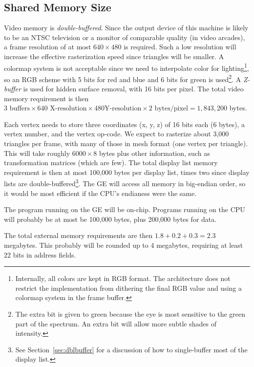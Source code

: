 \documentclass{book}
\begin{document}
\subsection{Shared Memory Size}

\quad Video memory is {\em
double-buffered}.  Since the output device of this machine is likely
to be an NTSC television or a monitor of comparable quality (in video
arcades), a frame resolution of at most $640\times480$ is required. 
Such a low resolution will increase the effective rasterization speed
since triangles will be smaller.  A colormap system is not acceptable
since we need to interpolate color for lighting\footnote{Internally,
all colors are kept in RGB format.  The architecture does not restrict
the implementation from dithering the final RGB value and using a
colormap system in the frame buffer.}, so an RGB scheme with 5 bits
for red and blue and 6 bits for green is used\footnote{The extra bit
is given to green because the eye is most sensitive to the green part
of the spectrum.  An extra bit will allow more subtle shades of
intensity.}.  A {\em Z-buffer\/} is used for hidden surface removal,
with 16 bits per pixel.  The total video memory requirement is then
$3\mbox{ buffers}\times640\mbox{ X-resolution}\times480\mbox{
Y-resolution}\times2\mbox{ bytes/pixel} = 1,843,200$ bytes.

\vspace{1ex}\quad Each vertex needs
to store three coordinates (x, y, z) of 16 bits each (6 bytes), a
vertex number, and the vertex op-code.
We expect to rasterize about 3,000 triangles per frame, with many of
those in mesh format (one vertex per triangle).  This will take
roughly $6000 \times 8$ bytes plus other information, such as transformation
matrices (which are few).  The total display list memory requirement
is then at most 100,000 bytes per display list, times two since
display lists are double-buffered\footnote{See Section~\ref{sec:dblbuffer}
for a discussion of how to single-buffer most of the display list.}.
The GE will access all memory in big-endian order, so it would be most
efficient if the CPU's endianess were the same.

\vspace{1ex}\quad The program running on
the GE will be on-chip. Programs running on the CPU will probably be
at most be 100,000 bytes, plus 200,000 bytes for data.

\vspace{1ex}\quad The total external memory
requirements are then $1.8 + 0.2 + 0.3 = 2.3$ megabytes.  This
probably will be rounded up to 4 megabytes, requiring at least 22 bits
in address fields.
\end{document}
